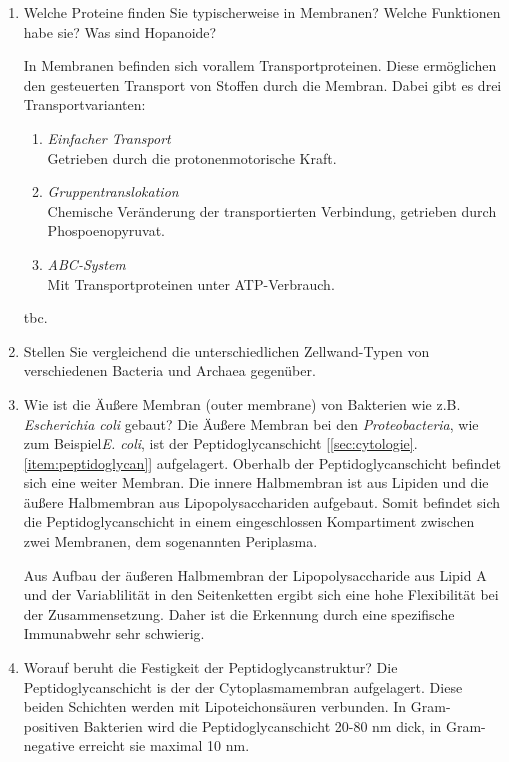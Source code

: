 \begin{enumerate}
	\item Welche Proteine finden Sie typischerweise in Membranen? Welche Funktionen habe sie? Was sind Hopanoide?
		
		In Membranen befinden sich vorallem Transportproteinen.
		Diese ermöglichen den gesteuerten Transport von Stoffen durch die Membran.
		Dabei gibt es drei Transportvarianten:
		\begin{enumerate}[label=\arabic*)]
			\item \emph{Einfacher Transport} \hfill \\ 
				Getrieben durch die protonenmotorische Kraft.
			\item \emph{Gruppentranslokation} \hfill \\ 
				Chemische Veränderung der transportierten Verbindung,
				getrieben durch Phospoenopyruvat.
			\item \emph{ABC-System} \hfill \\ 
				Mit Transportproteinen unter ATP-Verbrauch.
		\end{enumerate}

		tbc.

	\item Stellen Sie vergleichend die unterschiedlichen Zellwand-Typen von verschiedenen Bacteria und Archaea gegenüber.

	\item Wie ist die Äußere Membran (outer membrane) von Bakterien wie z.B. \emph{Escherichia coli} gebaut?
		Die Äußere Membran bei den \emph{Proteobacteria},
		wie zum Beispiel\emph{E. coli},
		ist der Peptidoglycanschicht [\ref{sec:cytologie}.\ref{item:peptidoglycan}] aufgelagert.
		Oberhalb der Peptidoglycanschicht befindet sich eine weiter Membran.
		Die innere Halbmembran ist aus Lipiden und die äußere Halbmembran aus Lipopolysacchariden aufgebaut.
		Somit befindet sich die Peptidoglycanschicht in einem eingeschlossen Kompartiment zwischen zwei Membranen,
		dem sogenannten Periplasma.

		Aus Aufbau der äußeren Halbmembran der Lipopolysaccharide aus Lipid A und
		der Variablilität in den Seitenketten ergibt sich eine hohe Flexibilität bei der Zusammensetzung.
		Daher ist die Erkennung durch eine spezifische Immunabwehr sehr schwierig.

	\item Worauf beruht die Festigkeit der Peptidoglycanstruktur? 
		\label{item:peptidoglycan}
		Die Peptidoglycanschicht is der der Cytoplasmamembran aufgelagert.
		Diese beiden Schichten werden mit Lipoteichonsäuren verbunden.
		In Gram-positiven Bakterien wird die Peptidoglycanschicht 20-80 nm dick,
		in Gram-negative erreicht sie maximal 10 nm.


\end{enumerate}
